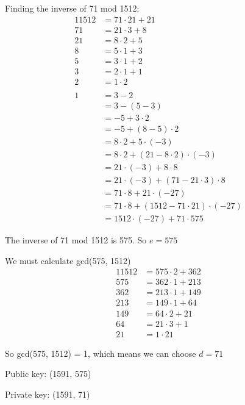 \documentclass{article} %
\begin{document}
    Finding the inverse of 71 mod 1512:
    \begin{alignat*}{1}
        1512 &= 71 \cdot 21 + 21\\
        71   &= 21 \cdot 3 + 8\\
        21   &= 8 \cdot 2 + 5\\
        8    &= 5 \cdot 1 + 3\\
        5    &= 3 \cdot 1 + 2\\
        3    &= 2 \cdot 1 + 1\\
        2    &= 1 \cdot 2\\
        \\
        1 &= 3 - 2\\
          &= 3 - (5 - 3)\\
          &= -5 + 3 \cdot 2\\
          &= -5 + (8 - 5) \cdot 2\\
          &= 8 \cdot 2 + 5 \cdot (-3)\\
          &= 8 \cdot 2 + (21 - 8 \cdot 2) \cdot (-3)\\
          &= 21 \cdot (-3) + 8 \cdot 8\\
          &= 21 \cdot (-3) + (71 - 21 \cdot 3) \cdot 8\\
          &= 71 \cdot 8 + 21 \cdot (-27)\\
          &= 71 \cdot 8 + (1512 - 71 \cdot 21) \cdot (-27)\\
          &= 1512 \cdot (-27) + 71 \cdot 575
    \end{alignat*}

    The inverse of 71 mod 1512 is 575. So $e = 575$ 

    We must calculate gcd(575, 1512)
    \begin{alignat*}{1}
        1512 &= 575 \cdot 2 + 362\\
        575 &= 362 \cdot 1 + 213\\
        362 &= 213 \cdot 1 + 149\\
        213 &= 149 \cdot 1 + 64\\
        149 &= 64 \cdot 2 + 21\\
        64 &= 21 \cdot 3 + 1\\
        21 &= 1 \cdot 21
    \end{alignat*}

    So gcd(575, 1512) = 1, which means we can choose $d = 71$

    Public key: (1591, 575)

    Private key: (1591, 71)
\end{document}
